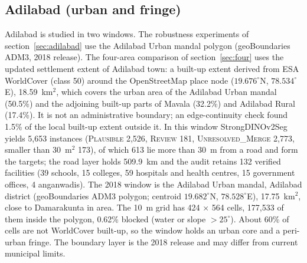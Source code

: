 \documentclass[12pt,a4paper]{article}
\newcommand{\dinoseg}{StrongDINOv2Seg}
\begin{document}
\subsection{Adilabad (urban and fringe)}\label{sec:adilabad_data}
Adilabad is studied in two windows. The robustness experiments of section~\ref{sec:adilabad} use the Adilabad Urban mandal polygon (geoBoundaries ADM3, 2018 release). The four-area comparison of section~\ref{sec:four} uses the updated settlement extent of Adilabad town: a built-up extent derived from ESA WorldCover (class 50) around the OpenStreetMap place node ($19.676^{\circ}$N, $78.534^{\circ}$E), 18.59~km$^2$, which covers the urban area of the Adilabad Urban mandal (50.5\%) and the adjoining built-up parts of Mavala (32.2\%) and Adilabad Rural (17.4\%). It is not an administrative boundary; an edge-continuity check found 1.5\% of the local built-up extent outside it. In this window \dinoseg{} yields 5{,}653 instances (\textsc{Plausible} 2{,}526, \textsc{Review} 181, \textsc{Unresolved\_Merge} 2{,}773, smaller than 30~m$^2$ 173), of which 613 lie more than 30~m from a road and form the targets; the road layer holds 509.9~km and the audit retains 132 verified facilities (39 schools, 15 colleges, 59 hospitals and health centres, 15 government offices, 4 anganwadis).
The 2018 window is the Adilabad Urban mandal, Adilabad district (geoBoundaries ADM3 polygon; centroid $19.682^{\circ}$N, $78.528^{\circ}$E), 17.75~km$^2$, close to Damarakunta in area. The 10~m grid has 424 $\times$ 564 cells, 177{,}533 of them inside the polygon, 0.62\% blocked (water or slope $>25^{\circ}$). About 60\% of cells are not WorldCover built-up, so the window holds an urban core and a peri-urban fringe. The boundary layer is the 2018 release and may differ from current municipal limits.
\end{document}
